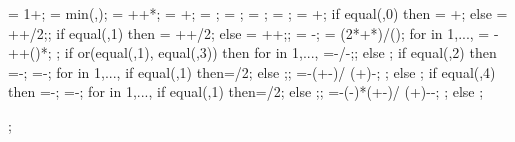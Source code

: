{{\dofloch = 1+\doflocfloor;
\minlen = min(\storyheight,\baywidth);
\dofxx = \x{\dofloccolumn}+\dofoffsetratio*\minlen+*\showdefl;
\dofyy = \y{\dofloch}+\dofoffsetratio*\minlen;
\arrlen = \arrowlenratio*\minlen;
\arrrad = \rotarrowlenratio*\minlen;
\Xaxesstarty = ;
\Yaxesstartx = ;
\Yaxesstarty = \y{\levelnumber}+\axisseperation;
if equal(\showsupports,0) then
{\Xaxesstartx = \x{\columnnumber}+\axisseperation;} else
{\Xaxesstartx = \x{\columnnumber}+\axisseperation+\supportwidth/2;};
if equal(\showsupports,1) then
{\Xaxesstartx = \x{\columnnumber}+\axisseperation+\supportwidth/2;} else
{\Xaxesstartx = \x{\columnnumber}+\axisseperation+\supportwidth;};
\pilecoordy = -\supportheight;
\pilespace = 
(2*\supportwidth+*\pilesidespace)/();
for \pileind in {1,...,{\numberofpiles}}{
\pilecoordx{\pileind} = -\supportwidth+\pilesidespace+()*\pilespace;
};
if or(equal(\latloadtype,1), equal(\latloadtype,3)) then {
for \iarr in {1,...,{\levelnumber}}{
	\arrstartx{\iarr}=-\toparrlen*\y{\iarr}/\structheight-\latloadshift;};
} else {};
if equal(\latloadtype,2) then {
	=-\latloadshift;
	=-\isomidy;
	for \iarr in {1,...,{\levelnumber}}{
		if equal(\iarr,1) then{\addtempy=\supportheight/2;} else {;};
		\arrstartx{\iarr}=-\toparrlen*(\y{\iarr}+\isomidy-\addtempy)/
		(\structheight+\isomidy)-\latloadshift;
	};
} else {};
if equal(\latloadtype,4) then {
	=-\latloadshift;
	=-\isomidy;
	for \iarr in {1,...,{\levelnumber}}{
		if equal(\iarr,1) then{\addtempy=\supportheight/2;} else {;};
		\arrstartx{\iarr}=-(\toparrlen-\basearrlen)*(\y{\iarr}+\isomidy-\addtempy)/
		(\structheight+\isomidy)-\latloadshift-\basearrlen;
	};
} else {};
}   %


\begin{scope}[x=1pt, y=1pt, xshift=\startx, yshift=\starty, rotate=0];


\end{scope}}
